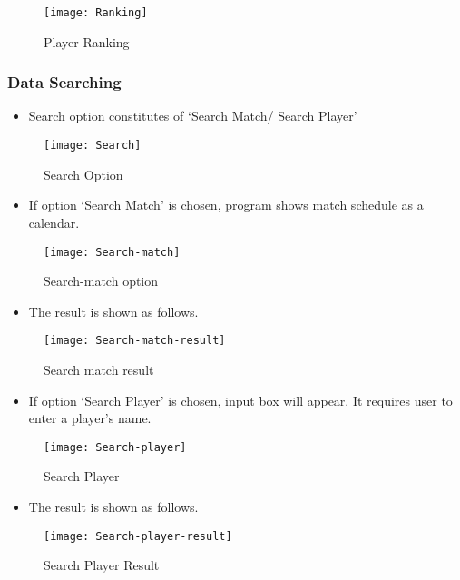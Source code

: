 \documentclass[conference,compsoc, twocolumn]{IEEEtran}
\begin{document}
\begin{figure}[H]
\centering\texttt{[image: Ranking]}
\caption{Player Ranking}
\end{figure}

\subsubsection{Data Searching}
\begin{itemize}
\item Search option constitutes of  ‘Search Match/ Search Player’
\end{itemize}
\begin{figure}[H]
\centering\texttt{[image: Search]}
\caption{Search Option}
\end{figure}

\begin{itemize}
\item If option ‘Search Match’ is chosen, program shows match schedule as a calendar.
\end{itemize}
\begin{figure}[H]
\centering\texttt{[image: Search-match]}
\caption{Search-match option}
\end{figure}

\begin{itemize}
\item The result is shown as follows.
\end{itemize}
\begin{figure}[H]
\centering\texttt{[image: Search-match-result]}
\caption{Search match result}
\end{figure}

\begin{itemize}
\item If option ‘Search Player’ is chosen, input box will appear. It requires user to enter a player’s name.
\end{itemize}
\begin{figure}[H]
\centering\texttt{[image: Search-player]}
\caption{Search Player}
\end{figure}

\begin{itemize}
\item The result is shown as follows.
\end{itemize}
\begin{figure}[H]
\centering\texttt{[image: Search-player-result]}
\caption{Search Player Result}
\end{figure}
\end{document}
